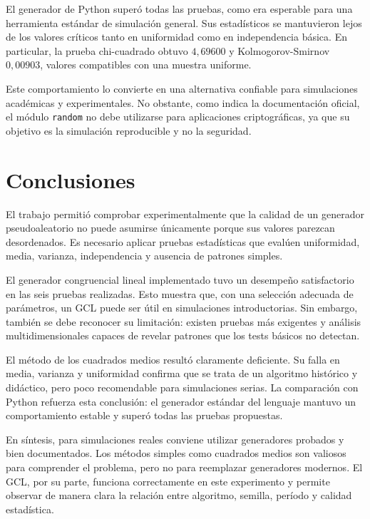 \documentclass{article}
\begin{document}
El generador de Python superó todas las pruebas, como era esperable para una
herramienta estándar de simulación general. Sus estadísticos se mantuvieron lejos
de los valores críticos tanto en uniformidad como en independencia básica. En
particular, la prueba chi-cuadrado obtuvo $4{,}69600$ y Kolmogorov-Smirnov
$0{,}00903$, valores compatibles con una muestra uniforme.

Este comportamiento lo convierte en una alternativa confiable para simulaciones
académicas y experimentales. No obstante, como indica la documentación oficial,
el módulo \texttt{random} no debe utilizarse para aplicaciones criptográficas,
ya que su objetivo es la simulación reproducible y no la seguridad.

\section{Conclusiones}

El trabajo permitió comprobar experimentalmente que la calidad de un generador
pseudoaleatorio no puede asumirse únicamente porque sus valores parezcan
desordenados. Es necesario aplicar pruebas estadísticas que evalúen uniformidad,
media, varianza, independencia y ausencia de patrones simples.

El generador congruencial lineal implementado tuvo un desempeño satisfactorio en
las seis pruebas realizadas. Esto muestra que, con una selección adecuada de
parámetros, un GCL puede ser útil en simulaciones introductorias. Sin embargo,
también se debe reconocer su limitación: existen pruebas más exigentes y
análisis multidimensionales capaces de revelar patrones que los tests básicos no
detectan.

El método de los cuadrados medios resultó claramente deficiente. Su falla en
media, varianza y uniformidad confirma que se trata de un algoritmo histórico y
didáctico, pero poco recomendable para simulaciones serias. La comparación con
Python refuerza esta conclusión: el generador estándar del lenguaje mantuvo un
comportamiento estable y superó todas las pruebas propuestas.

En síntesis, para simulaciones reales conviene utilizar generadores probados y
bien documentados. Los métodos simples como cuadrados medios son valiosos para
comprender el problema, pero no para reemplazar generadores modernos. El GCL,
por su parte, funciona correctamente en este experimento y permite observar de
manera clara la relación entre algoritmo, semilla, período y calidad estadística.
\end{document}
